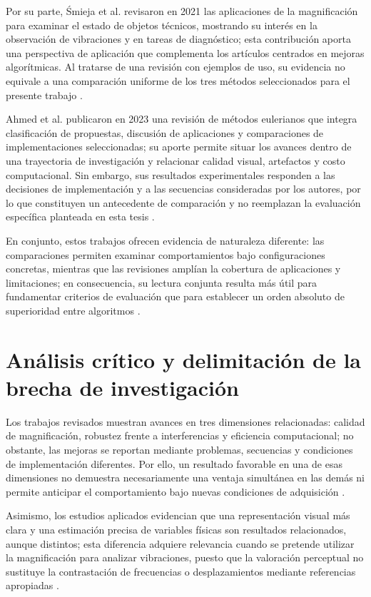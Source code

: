 Por su parte, Śmieja et al. revisaron en 2021 las aplicaciones de la magnificación para examinar el estado de objetos técnicos, mostrando su interés en la observación de vibraciones y en tareas de diagnóstico; esta contribución aporta una perspectiva de aplicación que complementa los artículos centrados en mejoras algorítmicas. Al tratarse de una revisión con ejemplos de uso, su evidencia no equivale a una comparación uniforme de los tres métodos seleccionados para el presente trabajo \cite{smieja2021motion}.

Ahmed et al. publicaron en 2023 una revisión de métodos eulerianos que integra clasificación de propuestas, discusión de aplicaciones y comparaciones de implementaciones seleccionadas; su aporte permite situar los avances dentro de una trayectoria de investigación y relacionar calidad visual, artefactos y costo computacional. Sin embargo, sus resultados experimentales responden a las decisiones de implementación y a las secuencias consideradas por los autores, por lo que constituyen un antecedente de comparación y no reemplazan la evaluación específica planteada en esta tesis \cite{ahmed2023overview}.

En conjunto, estos trabajos ofrecen evidencia de naturaleza diferente: las comparaciones permiten examinar comportamientos bajo configuraciones concretas, mientras que las revisiones amplían la cobertura de aplicaciones y limitaciones; en consecuencia, su lectura conjunta resulta más útil para fundamentar criterios de evaluación que para establecer un orden absoluto de superioridad entre algoritmos \cite{yadav2020performance,smieja2021motion,ahmed2023overview}.

\section{Análisis crítico y delimitación de la brecha de investigación}

Los trabajos revisados muestran avances en tres dimensiones relacionadas: calidad de magnificación, robustez frente a interferencias y eficiencia computacional; no obstante, las mejoras se reportan mediante problemas, secuencias y condiciones de implementación diferentes. Por ello, un resultado favorable en una de esas dimensiones no demuestra necesariamente una ventaja simultánea en las demás ni permite anticipar el comportamiento bajo nuevas condiciones de adquisición \cite{wadhwa2013phase,wadhwa2014riesz,takeda2022bilateral,ahmed2023overview}.

Asimismo, los estudios aplicados evidencian que una representación visual más clara y una estimación precisa de variables físicas son resultados relacionados, aunque distintos; esta diferencia adquiere relevancia cuando se pretende utilizar la magnificación para analizar vibraciones, puesto que la valoración perceptual no sustituye la contrastación de frecuencias o desplazamientos mediante referencias apropiadas \cite{yang2024phase,mattioli2023breathing}.

